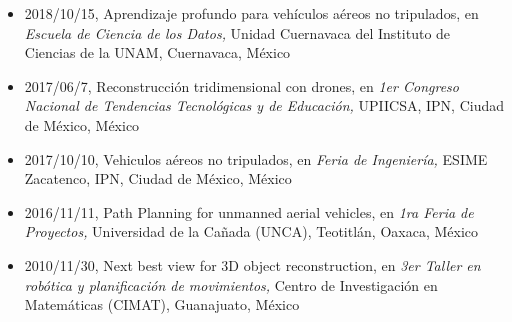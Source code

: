 \begin{itemize}
\item 2018/10/15, Aprendizaje profundo para vehículos aéreos no tripulados, en \textit{ Escuela de Ciencia de los Datos,} Unidad Cuernavaca del Instituto de Ciencias de la UNAM, Cuernavaca, México 
\item 2017/06/7, Reconstrucción tridimensional con drones, en \textit{ 1er Congreso Nacional de Tendencias Tecnológicas y de Educación,} UPIICSA, IPN, Ciudad de México, México 
\item 2017/10/10, Vehiculos aéreos no tripulados, en \textit{ Feria de Ingeniería,} ESIME Zacatenco, IPN, Ciudad de México, México 
\item 2016/11/11, Path Planning for unmanned aerial vehicles, en \textit{ 1ra Feria de Proyectos,} Universidad de la Cañada (UNCA), Teotitlán, Oaxaca, México 
\item 2010/11/30, Next best view for 3D object reconstruction, en \textit{ 3er Taller en robótica y planificación de movimientos,} Centro de Investigación en Matemáticas (CIMAT), Guanajuato, México 
\end{itemize} 
